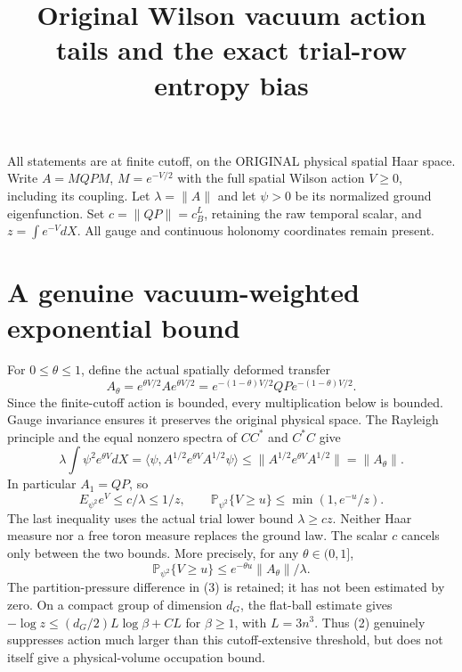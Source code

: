 \documentclass{article}
\title{Original Wilson vacuum action tails and the exact trial-row entropy bias}\author{}\date{}
\begin{document}
\maketitle
All statements are at finite cutoff, on the ORIGINAL physical spatial Haar space. Write $A=M Q P M$, $M=e^{-V/2}$ with the full spatial Wilson action $V\ge0$, including its coupling. Let $\lambda=\|A\|$ and let $\psi>0$ be its normalized ground eigenfunction. Set $c=\|QP\|=c_B^L$, retaining the raw temporal scalar, and $z=\int e^{-V}dX$. All gauge and continuous holonomy coordinates remain present.

\section*{A genuine vacuum-weighted exponential bound}
For $0\le\theta\le1$, define the actual spatially deformed transfer
\[
 A_\theta=e^{\theta V/2}A e^{\theta V/2}
 =e^{-(1-\theta)V/2}QP e^{-(1-\theta)V/2}.
\]
Since the finite-cutoff action is bounded, every multiplication below is bounded. Gauge invariance ensures it preserves the original physical space. The Rayleigh principle and the equal nonzero spectra of $CC^*$ and $C^*C$ give
\[
 \lambda\int\psi^2 e^{\theta V}dX
 =\langle\psi,A^{1/2}e^{\theta V}A^{1/2}\psi\rangle
 \le\|A^{1/2}e^{\theta V}A^{1/2}\|
 =\|A_\theta\|.                                      \tag{1}
\]
In particular $A_1=QP$, so
\[
 E_{\psi^2}e^V\le c/\lambda\le1/z,\qquad
 \mathbb P_{\psi^2}\{V\ge u\}\le\min(1,e^{-u}/z).     \tag{2}
\]
The last inequality uses the actual trial lower bound $\lambda\ge cz$. Neither Haar measure nor a free toron measure replaces the ground law. The scalar $c$ cancels only between the two bounds. More precisely, for any $\theta\in(0,1]$,
\[
 \mathbb P_{\psi^2}\{V\ge u\}
 \le e^{-\theta u}\|A_\theta\|/\lambda.               \tag{3}
\]
The partition-pressure difference in (3) is retained; it has not been estimated by zero. On a compact group of dimension $d_G$, the flat-ball estimate gives $-\log z\le (d_G/2)L\log\beta+CL$ for $\beta\ge1$, with $L=3n^3$. Thus (2) genuinely suppresses action much larger than this cutoff-extensive threshold, but does not itself give a physical-volume occupation bound.
\end{document}
